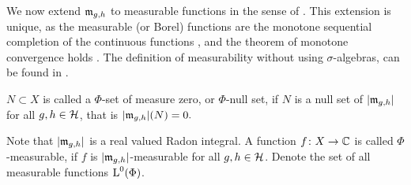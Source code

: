 % 
% 
We now extend $\mathfrak{m}_{g,h}$ to measurable functions in the sense of 
\cite[Ch. 4.5]{PedAnaN}. This extension is unique, 
as the measurable (or Borel) functions are the monotone sequential 
completion of the continuous functions \cite[Propostition 6.2.9]{PedAnaN},
and the theorem of monotone convergence holds \cite[Theorem 6.1.13]{PedAnaN}.
The definition
 of measurability without using $\sigma$-algebras, can be found in
 \cite[Ch. 6.3]{PedAnaN}.
\begin{defi}\label{defmeasurable}
 $N \subset X$ is called a $\Phi$-set of measure zero, or $\Phi$-null set, if
 $N$ is a null set of $| \mathfrak{m}_{g,h}|$ for all $g,h \in \mathcal{H}$, that is  
  $| \mathfrak{m}_{g, h} | (N) =0.$
  
 Note that $| \mathfrak{m}_{g, h} |$ is a real valued Radon integral. 
 A function $f\colon X \to \mathbb{C}$ is called $\Phi$-measurable, if $f$ is 
 $|\mathfrak{m}_{g,h}|$-measurable for all $g,h \in \mathcal{H}$. 
 Denote the set of all measurable functions  ${\text{L}^0}(\Phi)$.
 


\end{defi}
